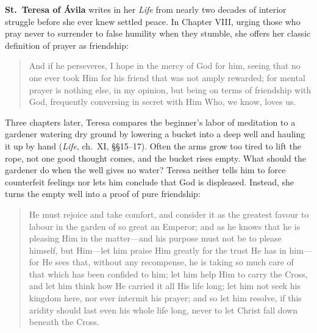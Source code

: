 \textbf{St.\ Teresa of Ávila} writes in her \emph{Life} from nearly two decades of interior struggle before she ever knew settled peace. In Chapter VIII, urging those who pray never to surrender to false humility when they stumble, she offers her classic definition of prayer as friendship:

\begin{quote}
And if he perseveres, I hope in the mercy of God for him, seeing that no one ever took Him for his friend that was not amply rewarded; for mental prayer is nothing else, in my opinion, but being on terms of friendship with God, frequently conversing in secret with Him Who, we know, loves us.
\end{quote}

Three chapters later, Teresa compares the beginner's labor of meditation to a gardener watering dry ground by lowering a bucket into a deep well and hauling it up by hand (\emph{Life}, ch.\ XI, \S\S 15--17). Often the arms grow too tired to lift the rope, not one good thought comes, and the bucket rises empty. What should the gardener do when the well gives no water? Teresa neither tells him to force counterfeit feelings nor lets him conclude that God is displeased. Instead, she turns the empty well into a proof of pure friendship:

\begin{quote}
He must rejoice and take comfort, and consider it as the greatest favour to labour in the garden of so great an Emperor; and as he knows that he is pleasing Him in the matter---and his purpose must not be to please himself, but Him---let him praise Him greatly for the trust He has in him---for He sees that, without any recompense, he is taking so much care of that which has been confided to him; let him help Him to carry the Cross, and let him think how He carried it all His life long; let him not seek his kingdom here, nor ever intermit his prayer; and so let him resolve, if this aridity should last even his whole life long, never to let Christ fall down beneath the Cross.
\end{quote}

